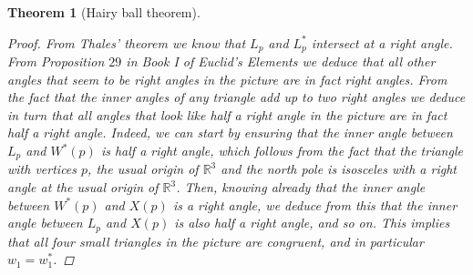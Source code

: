 \documentclass[A4paper, 12pt, british, reqno]{amsart}
\newcommand{\R}{\mathbb{R}} %
\theoremstyle{plain}
\newtheorem{thm}{Theorem}[section]
\theoremstyle{definition}
\theoremstyle{remark}
\theoremstyle{plain}
\theoremstyle{definition}
\theoremstyle{remark}
\theoremstyle{plain}
\theoremstyle{definition}
\theoremstyle{remark}
\begin{document}
\begin{thm}[Hairy ball theorem]
\begin{proof}
	From Thales' theorem we know that $L_{p}$ and $L^{*}_{p}$ intersect at a right angle.
	From Proposition $29$ in Book I of Euclid's \textit{Elements} we deduce that all other angles that seem to be right angles in the picture are in fact right angles.
	From the fact that the inner angles of any triangle add up to two right angles we deduce in turn that all angles that look like half a right angle in the picture are in fact half a right angle.
	Indeed, we can start by ensuring that the inner angle between $L_{p}$ and $W^{*}(p)$ is half a right angle, which follows from the fact that the triangle with vertices $p$, the usual origin of $\R^{3}$ and the north pole is isosceles with a right angle at the usual origin of $\R^{3}$.
	Then, knowing already that the inner angle between $W^{*}(p)$ and $X(p)$ is a right angle, we deduce from this that the inner angle between $L_{p}$ and $X(p)$ is also half a right angle, and so on.
	This implies that all four small triangles in the picture are congruent, and in particular $w_{1}=w_{1}^{*}$.


\end{proof}
\end{thm}
\end{document}
